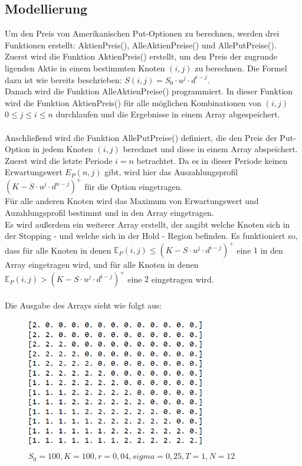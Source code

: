 \documentclass[12pt,a4paper]{article}
\begin{document}
\begin{text}
\subsection{Modellierung}
Um den Preis von Amerikanischen Put-Optionen zu berechnen, werden drei Funktionen erstellt: AktienPreis(), AlleAktienPreise() und AllePutPreise().
\\
Zuerst wird die Funktion AktienPreis() erstellt, um den Preis der zugrunde ligenden Aktie in einem bestimmten Knoten $(i,j)$ zu berechnen. Die Formel dazu ist wie bereits beschrieben: $S(i,j)= S_0 \cdot u^j \cdot d^{i-j}$. 
\\
Danach wird die Funktion AlleAktienPreise() programmiert. In dieser Funktion wird die Funktion AktienPreis() für alle möglichen Kombinationen von $(i,j)$ $0 \leqslant j \leqslant i \leqslant n$ durchlaufen und die Ergebnisse in einem Array abgespeichert. 
\\\\
Anschließend wird die Funktion AllePutPreise() definiert, die den Preis der Put-Option in jedem Knoten $(i,j)$ berechnet und diese in einem Array abspeichert. Zuerst wird die letzte Periode $i=n$ betrachtet. Da es in dieser Periode keinen Erwartungswert ${E}_P(n,j)$ gibt, wird hier das Auszahlungsprofil $(K - S \cdot u^j \cdot d^{n-j})^+$ für die Option eingetragen. 
\\
Für alle anderen Knoten wird das Maximum von Erwartungswert und Auzahlungsprofil bestimmt und in den Array eingetragen.
\\
Es wird außerdem ein weiterer Array erstellt, der angibt welche Knoten sich in der Stopping - und welche sich in der Hold - Region befinden. Es funktioniert so, dass für alle Knoten in denen 
$\mathbb{E}_P(i,j) \leq (K - S \cdot u^j \cdot d^{i-j})^+$ eine $1$ in den Array eingetragen wird, und für alle Knoten in denen 
$\mathbb{E}_P(i,j) > (K - S \cdot u^j \cdot d^{i-j})^+$ eine $2$ eingetragen wird.
\\\\
Die Ausgabe des Arrays sieht wie folgt aus:

\begin{figure}[h]
\begin{center}
 \includegraphics[width=0.7\textwidth]{ArrayBild.PNG}
 \caption{$S_0 = 100, K = 100, r = 0,04, sigma = 0,25 , T = 1, N = 12$}
\end{center}
\end{figure}


\end{text}
\end{document}
